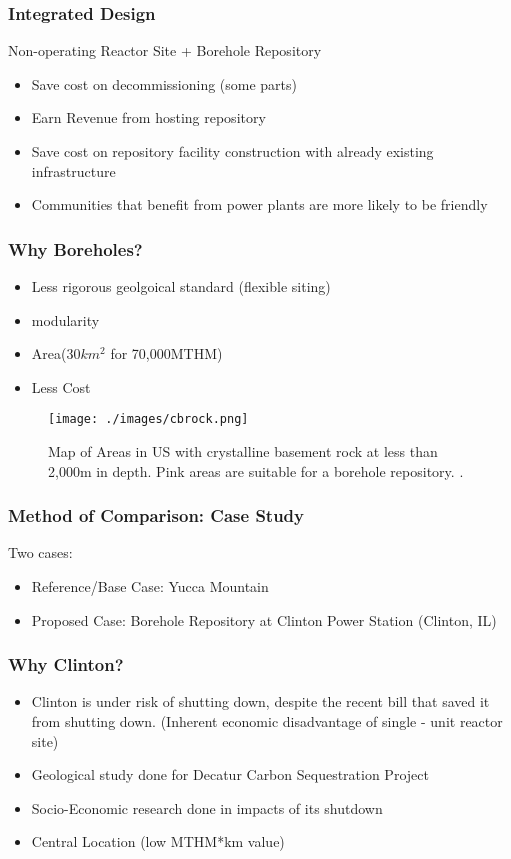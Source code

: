 	\begin{frame}
	\frametitle{Integrated Design}
	Non-operating Reactor Site + Borehole Repository
	\begin{itemize}
		\item Save cost on decommissioning (some parts)
		\item Earn Revenue from hosting repository
		\item Save cost on repository facility construction
			  with already existing infrastructure
		\item Communities that benefit from power plants are more likely
			  to be friendly
	\end{itemize}
\end{frame}

\begin{frame}
	\frametitle{Why Boreholes?}
	\begin{itemize}
		\item Less rigorous geolgoical standard (flexible siting)
		\item modularity
		\item Area(30$km^2$ for 70,000MTHM)
		\item Less Cost
	\end{itemize}
	\begin{figure}[htbp!]
		\begin{center}
			\texttt{[image: ./images/cbrock.png]}
		\end{center}
		\caption{Map of Areas in US with crystalline basement rock at less than 2,000m in depth.
			Pink areas are suitable for a borehole repository.
			 \cite{freeze_siting_2015}.}
		\label{fig:basement_map}
	\end{figure}
\end{frame}

\begin{frame}
	\frametitle{Method of Comparison: Case Study}
	Two cases:
	\begin{itemize}
		\item Reference/Base Case: Yucca Mountain
		\item Proposed Case: Borehole Repository at Clinton Power Station (Clinton, IL)
	\end{itemize}
\end{frame}

\begin{frame}
	\frametitle{Why Clinton?}
	\begin{itemize}
		\item Clinton is under risk of shutting down, despite the recent bill that saved
		it from shutting down. (Inherent economic disadvantage of single - unit reactor site)
		\item Geological study done for Decatur Carbon Sequestration Project
		\item Socio-Economic research done in impacts of its shutdown
		\item Central Location (low MTHM*km value)
	\end{itemize}
\end{frame}

